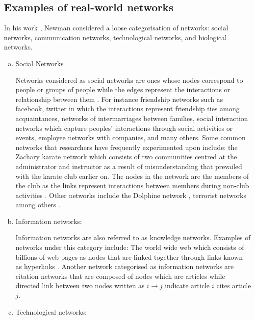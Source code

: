 \documentclass[10pt,a4paper]{article}
\begin{document}

\subsection{Examples of real-world networks}
In his work \citep{newman2003structure}, Newman considered a loose categorisation of networks: social networks, communication networks, technological networks, and biological networks.
\begin{enumerate}[a.]
	\item Social Networks
	
	Networks considered as social networks are ones whose nodes correspond to people or groups of people while the edges represent the interactions or relationship between them \citep{jackson2010social}. For instance friendship networks such as facebook, twitter in which the interactions represent friendship ties among acquaintances, networks of intermarriages between families, social interaction networks which capture peoples' interactions through social activities or events, employee networks with companies, and many others.
	Some common networks that researchers have frequently experimented upon include: the Zachary karate network which consists of two communities centred at the administrator and instructor as a result of misunderstanding that prevailed with the karate club earlier on. The nodes in the network are the members of the club as the links represent interactions between members during non-club activities \citep{zachary1977information}. Other networks include the Dolphine network \citep{williams1993abundance}, terrorist networks \citep{magouirk2008connecting} among others .
	
	\item Information networks: 
	
	Information networks are also referred to as knowledge networks. Examples of networks under this category include: 
	The world wide web which consists of billions of web pages as nodes that are linked together through links known as hyperlinks \citep{huberman2001laws}.
	Another network categorised as information networks are citation networks that are composed of nodes which are articles while directed link between two nodes written as $i\longrightarrow j$ indicate article $i$ cites article $j$.
	\item Technological networks:
	

\end{enumerate}
\end{document}
